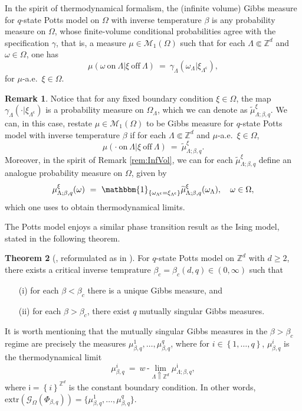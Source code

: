 \documentclass[12pt]{article}
\newcommand{\G}{\mathcal{G}}
\newcommand{\M}{\mathcal{M}}
\newcommand{\Z}{\mathbb{Z}}
\newcommand{\set}[1]{\left\{#1\right\}}
\newcommand{\pika}{\boldsymbol{\cdot}}
\newcommand{\1}{\mathbbm{1}}
\renewcommand{\c}{\mathsf{c}}
\newcommand{\5}{\vspace{0.5cm}}
\renewcommand{\tilde}{\widetilde}
\theoremstyle{definition}
\newtheorem{thm}{Theorem}[section]
\newtheorem{rem}[thm]{Remark}
\begin{document}
In the spirit of thermodynamical formalism, the (infinite volume) Gibbs measure for $q$-state Potts model on $\Omega$ with inverse temperature $\beta$ is any probability measure on $\Omega$, whose finite-volume conditional probabilities agree with the specification $\gamma$, that is, a measure $\mu\in\M_1(\Omega)$ such that for each $\Lambda\Subset\Z^d$ and $\omega\in\Omega$, one has
$$\mu(\omega~\text{on}~\Lambda|\xi~\text{off}~\Lambda) ~=~ \gamma_\Lambda(\omega_\Lambda|\xi_{\Lambda^\c}),$$
for $\mu$-a.e.~$\xi\in\Omega$.

\begin{rem}
Notice that for any fixed boundary condition $\xi\in\Omega$, the map $\gamma_\Lambda(\pika|\xi_{\Lambda^\c})$ is a probability measure on $\Omega_\Lambda$, which we can denote as $\tilde{\mu}_{\Lambda;\beta,q}^\xi$. We can, in this case, restate $\mu\in\M_1(\Omega)$ to be Gibbs measure for $q$-state Potts model with inverse temperature $\beta$ if for each $\Lambda\Subset\Z^d$ and $\mu$-a.e.~$\xi\in\Omega$, 
$$\mu(\pika~\text{on}~\Lambda|\xi~\text{off}~\Lambda) ~=~ \tilde{\mu}_{\Lambda;\beta,q}^\xi.$$
Moreover, in the spirit of Remark \ref{rem:InfVol}, we can for each $\tilde{\mu}_{\Lambda;\beta,q}^\xi$ define an analogue probability measure on $\Omega$, given by
$$\mu_{\Lambda;\beta,q}^\xi(\omega) ~=~ \1_{\set{\omega_{\Lambda^\c}=\xi_{\Lambda^\c}}}\tilde{\mu}_{\Lambda;\beta,q}^\xi(\omega_\Lambda), \quad \omega\in\Omega,$$
which one uses to obtain thermodynamical limits.
\end{rem}

The Potts model enjoys a similar phase transition result as the Ising model,  stated in the following theorem.

\begin{thm}[\cite{ACCN}, reformulated as in \cite{GHM}]
For $q$-state Potts model on $\Z^d$ with $d\geq 2$, there exists a critical inverse temprature $\beta_c=\beta_c(d,q)\in(0,\infty)$ such that
\begin{itemize}
	\item[(i)] for each $\beta<\beta_c$ there is a unique Gibbs measure, and 
	\item[(ii)] for each $\beta>\beta_c$, there exist $q$ mutually singular Gibbs measures. 
\end{itemize}
\end{thm}

It is worth mentioning that the mutually singular Gibbs measures in the $\beta>\beta_c$ regime are precisely the measures $\mu_{\beta,q}^1,\ldots,\mu_{\beta,q}^q$, where for $i\in\set{1,\ldots,q}$, $\mu_{\beta,q}^i$ is the thermodynamical limit
$$\mu_{\beta,q}^i ~=~ w\,\text{-}\!\lim_{\Lambda\Uparrow\Z^d}\mu_{\Lambda;\beta,q}^{\mathsf{i}},$$
where $\mathsf{i}=\set{i}^{\Z^d}$ is the constant boundary condition. In other words, $\mathrm{extr}(\G_{\Omega}(\Phi_{\beta,q}))=\{\mu_{\beta,q}^1,\ldots,\mu_{\beta,q}^q\}$.
\end{document}

